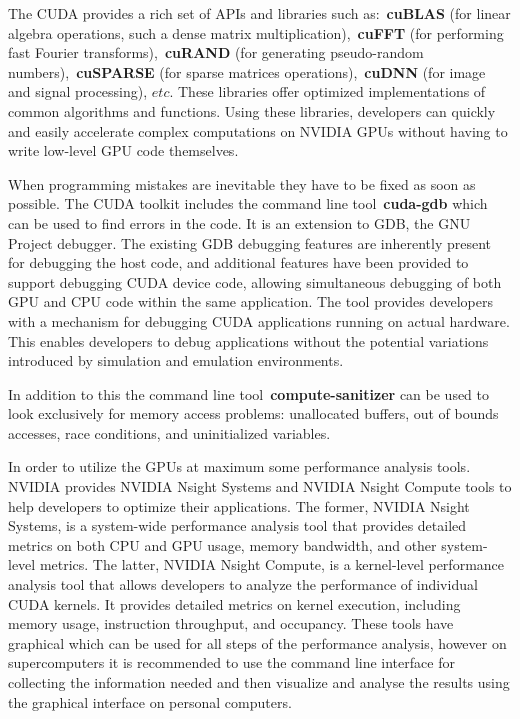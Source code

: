 \par
The CUDA provides a rich set of APIs and libraries such as:~\textbf{cuBLAS} (for linear algebra operations, such a dense matrix multiplication),~\textbf{cuFFT} (for performing fast Fourier transforms),~\textbf{cuRAND} (for generating pseudo-random numbers),~\textbf{cuSPARSE} (for sparse matrices operations),~\textbf{cuDNN} (for image and signal processing), $etc$.
These libraries offer optimized implementations of common algorithms and functions.
Using these libraries, developers can quickly and easily accelerate complex computations on NVIDIA GPUs without having to write low-level GPU code themselves.


\par
When programming mistakes are inevitable they have to be fixed as soon as possible.
The CUDA toolkit includes the command line tool~\textbf{cuda-gdb} which can be used to find errors in the code.
It is an extension to GDB, the GNU Project debugger.
The existing GDB debugging features are inherently present for debugging the host code, and additional features have been provided to support debugging CUDA device code, allowing simultaneous debugging of both GPU and CPU code within the same application.
The tool provides developers with a mechanism for debugging CUDA applications running on actual hardware.
This enables developers to debug applications without the potential variations introduced by simulation and emulation environments.


\par
In addition to this the command line tool~\textbf{compute-sanitizer} can be used to look exclusively for memory access problems: unallocated buffers, out of bounds accesses, race conditions, and uninitialized variables.


\par
In order to utilize the GPUs at maximum some performance analysis tools.
NVIDIA provides NVIDIA Nsight Systems and NVIDIA Nsight Compute tools to help developers to optimize their applications.
The former, NVIDIA Nsight Systems, is a system-wide performance analysis tool that provides detailed metrics on both CPU and GPU usage, memory bandwidth, and other system-level metrics.
The latter, NVIDIA Nsight Compute, is a kernel-level performance analysis tool that allows developers to analyze the performance of individual CUDA kernels.
It provides detailed metrics on kernel execution, including memory usage, instruction throughput, and occupancy.
These tools have graphical which can be used for all steps of the performance analysis, however on supercomputers it is recommended to use the command line interface for collecting the information needed and then visualize and analyse the results using the graphical interface on personal computers.


